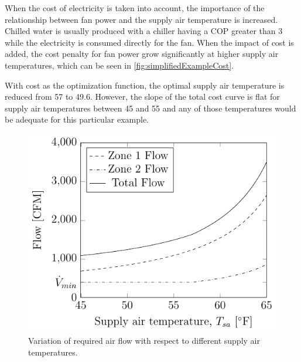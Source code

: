 When the cost of electricity is taken into account, the importance of
the relationship between fan power and the supply air temperature is
increased. Chilled water is usually produced with a chiller having a COP
greater than 3 while the electricity is consumed directly for the fan.
When the impact of cost is added, the cost penalty for fan power grow
significantly at higher supply air temperatures, which can be seen in
\figref{} \ref{fig:simplifiedExampleCost}. 

With cost as the optimization function, the optimal supply air
temperature is reduced from \SI{57}{\degF} to \SI{49.6}{\degF}. However,
the slope of the total cost curve is flat for supply air temperatures
between \SI{45}{\degF} and \SI{55}{\degF} and any of those temperatures
would be adequate for this particular example. 

\begin{figure}
\centering
\includegraphics{Plots/33-SimplifiedExampleFlow/simplifiedExampleFlow.pdf}
\caption{Variation of required air flow with respect to different supply
air temperatures.}
\label{fig:simplifiedExampleFlow}
\end{figure}

\newcommand{\variationCaption}[1]{Variation of total #1 with respect to different supply air temperatures. }

